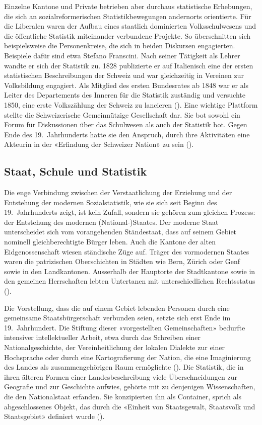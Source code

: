 Einzelne Kantone und Private betrieben aber durchaus statistische Erhebungen, die sich an sozialreformerischen Statistikbewegungen andernorts orientierte. Für die Liberalen waren der Aufbau eines staatlich dominierten Volksschulwesens und die öffentliche Statistik miteinander verbundene Projekte. So überschnitten sich beispielsweise die Personenkreise, die sich in beiden Diskursen engagierten. Beispiele dafür sind etwa Stefano Franscini. Nach seiner Tätigkeit als Lehrer wandte er sich der Statistik zu. 1828 publizierte er auf Italienisch eine der ersten statistischen Beschreibungen der Schweiz und war gleichzeitig in Vereinen zur Volksbildung engagiert. Als Mitglied des ersten Bundesrates ab 1848 war er als Leiter des Departements des Inneren für die Statistik zuständig und versuchte 1850, eine erste Volkszählung der Schweiz zu lancieren (\cite{marcacci_franscini_2022}). Eine wichtige Plattform stellte die Schweizerische Gemeinnützige Gesellschaft dar. Sie bot sowohl ein Forum für Diskussionen über das Schulwesen als auch der Statistik bot. Gegen Ende des 19.~Jahrhunderts hatte sie den Anspruch, durch ihre Aktivitäten eine Akteurin in der «Erfindung der Schweizer Nation» zu sein (\cite{criblez_schweizerische_2013,rothenbuhler_neue_2010}).

\subsection{Staat, Schule und Statistik}

Die enge Verbindung zwischen der Verstaatlichung der Erziehung und der Entstehung der modernen Sozialstatistik, wie sie sich seit Beginn des 19.~Jahrhunderts zeigt, ist kein Zufall, sondern sie gehören zum gleichen Prozess: der Entstehung des modernen (National-)Staates. Der moderne Staat unterscheidet sich vom vorangehenden Ständestaat, dass auf seinem Gebiet nominell gleichberechtigte Bürger leben. Auch die Kantone der alten Eidgenossenschaft wiesen ständische Züge auf. Träger des vormodernen Staates waren die patrizischen Oberschichten in Städten wie Bern, Zürich oder Genf sowie in den Landkantonen. Ausserhalb der Hauptorte der Stadtkantone sowie in den gemeinen Herrschaften lebten Untertanen mit unterschiedlichen Rechtsstatus (\cite[137-156]{maissen_geschichte_2011}). 

Die Vorstellung, dass die auf einem Gebiet lebenden Personen durch eine gemeinsame Staatsbürgerschaft verbunden seien, setzte sich erst Ende im 19.~Jahrhundert. Die Stiftung dieser «vorgestellten Gemeinschaften» bedurfte intensiver intellektueller Arbeit, etwa durch das Schreiben einer Nationalgeschichte, der Vereinheitlichung der lokalen Dialekte zur einer Hochsprache oder durch eine Kartografierung der Nation, die eine Imaginierung des Landes als zusammengehörigen Raum ermöglichte (\cite{anderson_imagined_1991}). Die Statistik, die in ihren älteren Formen einer Landesbeschreibung viele Überschneidungen zur Geografie und zur Geschichte aufwies, gehörte mit zu denjenigen Wissenschaften, die den Nationalstaat erfanden. Sie konzipierten ihn als Container, sprich als abgeschlossenes Objekt, das durch die «Einheit von Staatsgewalt, Staatsvolk und Staatsgebiet» definiert wurde (\cite{woolf_statistics_1989}).  

